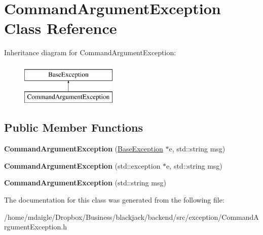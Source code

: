 \hypertarget{classCommandArgumentException}{
\section{\-Command\-Argument\-Exception \-Class \-Reference}
\label{da/d83/classCommandArgumentException}
}
\-Inheritance diagram for \-Command\-Argument\-Exception\-:\begin{figure}[H]
\begin{center}
\leavevmode
\includegraphics[height=2.000000cm]{da/d83/classCommandArgumentException}
\end{center}
\end{figure}
\subsection*{\-Public \-Member \-Functions}
\begin{DoxyCompactItemize}
\item 
\hypertarget{classCommandArgumentException_a90e424ef669a73137dc511bc82355ae2}{
{\bfseries \-Command\-Argument\-Exception} (\hyperlink{classBaseException}{\-Base\-Exception} $\ast$e, std\-::string msg)}
\label{da/d83/classCommandArgumentException_a90e424ef669a73137dc511bc82355ae2}

\item 
\hypertarget{classCommandArgumentException_a898cf3210cb20f97a1b8a4d34baa5a2d}{
{\bfseries \-Command\-Argument\-Exception} (std\-::exception $\ast$e, std\-::string msg)}
\label{da/d83/classCommandArgumentException_a898cf3210cb20f97a1b8a4d34baa5a2d}

\item 
\hypertarget{classCommandArgumentException_a141078ae4266039763d46b4559386652}{
{\bfseries \-Command\-Argument\-Exception} (std\-::string msg)}
\label{da/d83/classCommandArgumentException_a141078ae4266039763d46b4559386652}

\end{DoxyCompactItemize}


\-The documentation for this class was generated from the following file\-:\begin{DoxyCompactItemize}
\item 
/home/mdaigle/\-Dropbox/\-Business/blackjack/backend/src/exception/\-Command\-Argument\-Exception.\-h\end{DoxyCompactItemize}
